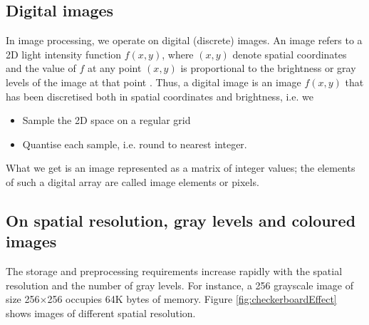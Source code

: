 \subsection{Digital images}

In image processing, we operate on digital (discrete) images.
An image refers to a 2D light intensity function \( f(x,y) \), where \( (x,y) \) denote spatial coordinates and the value of \( f \) at any point \( (x,y) \) is proportional to the brightness or gray levels of the image at that point \cite{imagProcFundamentals}.
Thus, a digital image is an image \( f(x,y)  \) that has been discretised both in spatial coordinates and brightness, i.e. we

\begin{itemize}
	\item Sample the 2D space on a regular grid
	\item Quantise each sample, i.e. round to nearest integer.
\end{itemize}

What we get is an image represented as a matrix of integer values; the elements of such a digital array are called image elements or pixels.




\subsection{On spatial resolution, gray levels and coloured images}

The storage and preprocessing requirements increase rapidly with the spatial resolution and the number of gray levels. 
For instance, a 256 grayscale image of size 256\( \times \)256 occupies 64K bytes of memory. Figure \ref{fig:checkerboardEffect} shows images of different spatial resolution. 

